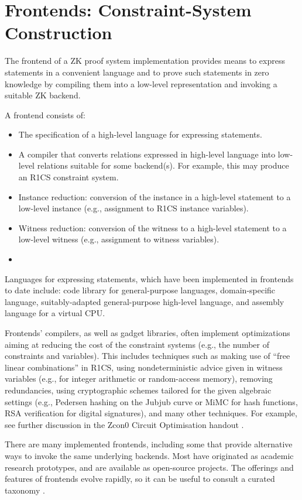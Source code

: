 \section{Frontends: Constraint-System Construction}
\label{implem:frontends}

The frontend of a ZK proof system implementation provides means to express statements in a convenient language and to prove such statements in zero knowledge by compiling them into a low-level representation and invoking a suitable ZK backend.

A frontend consists of:
\begin{itemize}
\item The specification of a high-level language for expressing statements.
\item A compiler that converts relations expressed in high-level language into low-level relations suitable for some backend(s). For example, this may produce an R1CS constraint system.
\item Instance reduction: conversion of the instance in a high-level statement to a low-level instance (e.g., assignment to R1CS instance variables).
\item Witness reduction: conversion of the witness to a high-level statement to a low-level witness (e.g., assignment to witness variables).
\item {}
\end{itemize}		


Languages for expressing statements, which have been implemented in frontends to date include: code library for general-purpose languages, domain-specific language, suitably-adapted general-purpose high-level language, and assembly language for a virtual CPU.

Frontends' compilers, as well as gadget libraries, often implement optimizations aiming at reducing the cost of the constraint systems (e.g., the number of constraints and variables).
This includes techniques such as making use of ``free linear combinations'' in R1CS, using nondeterministic advice given in witness variables (e.g., for integer arithmetic or random-access memory), removing redundancies, using cryptographic schemes tailored for the given algebraic settings (e.g., Pedersen hashing on the Jubjub curve or MiMC for hash functions, RSA verification for digital signatures), and many other techniques.
For example, see further discussion in the Zcon0 Circuit Optimisation handout \cite{2018:Dai:ZCon0:handout}.

There are many implemented frontends, including some that provide alternative ways to invoke the same underlying backends. Most have originated as academic research prototypes, and are available as open-source projects. 
The offerings and features of frontends evolve rapidly, so it can be useful to consult a curated taxonomy \cite{url:ZKP-science}.
